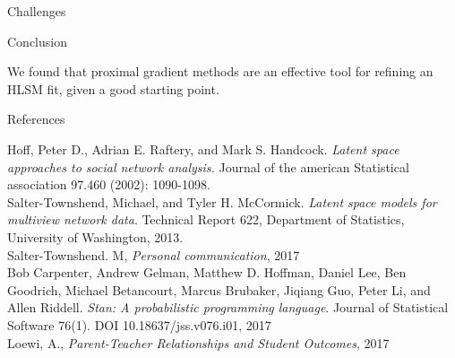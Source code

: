 \documentclass[final]{beamer}
\newlength{\onecolwid}
\begin{document}
\begin{frame}[t]
\begin{columns}[t]
\begin{column}{\onecolwid}
\begin{block}{Challenges}
\end{block}


%
%



\begin{block}{Conclusion}

We found that proximal gradient methods are an effective tool for
refining an HLSM fit, given a good starting point.


\end{block}



 \begin{block}{References}

 \small{
 \vspace{0.75in}}

Hoff, Peter D., Adrian E. Raftery, and Mark S. Handcock. \textit{Latent space approaches to social network analysis.} Journal of the american Statistical association 97.460 (2002): 1090-1098.\\
Salter-Townshend, Michael, and Tyler H. McCormick. \textit{Latent space models for multiview network data}. Technical Report 622, Department of Statistics, University of Washington, 2013.\\
Salter-Townshend. M, \textit{Personal communication}, 2017\\
Bob Carpenter, Andrew Gelman, Matthew D. Hoffman, Daniel Lee, Ben Goodrich, Michael Betancourt, Marcus Brubaker, Jiqiang Guo, Peter Li, and Allen Riddell. \textit{Stan: A probabilistic programming language}. Journal of Statistical Software 76(1). DOI 10.18637/jss.v076.i01, 2017\\
Loewi, A., \textit{Parent-Teacher Relationships and Student Outcomes}, 2017



\end{block}
\end{column}
\end{columns}
\end{frame}
\end{document}
